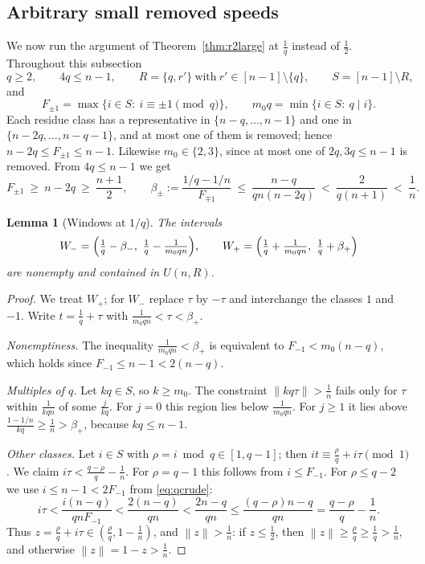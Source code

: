 \documentclass[11pt]{article}
\newtheorem{lemma}[theorem]{Lemma}
\theoremstyle{definition}
\newcommand{\norm}[1]{\left\lVert #1 \right\rVert}
\begin{document}
\subsection{Arbitrary small removed speeds}\label{sec:qgeneral}

We now run the argument of Theorem~\ref{thm:r2large} at $\frac1q$
instead of $\frac12$. Throughout this subsection
\[
q\ge2,\qquad 4q\le n-1,\qquad R=\{q,r'\}\ \text{with}\
r'\in[n-1]\setminus\{q\},\qquad S=[n-1]\setminus R,
\]
and
\[
F_{\pm1}=\max\{i\in S:\ i\equiv\pm1\pmod q\},\qquad
m_0q=\min\{i\in S:\ q\mid i\}.
\]
Each residue class has a representative in $\{n-q,\dots,n-1\}$ and one
in $\{n-2q,\dots,n-q-1\}$, and at most one of them is removed; hence
$n-2q\le F_{\pm1}\le n-1$. Likewise $m_0\in\{2,3\}$, since at most one
of $2q,3q\le n-1$ is removed. From $4q\le n-1$ we get
\begin{equation}\label{eq:qcrude}
F_{\pm1}\ \ge\ n-2q\ \ge\ \frac{n+1}2,\qquad
\beta_\pm:=\frac{1/q-1/n}{F_{\mp1}}\ \le\ \frac{n-q}{qn(n-2q)}
\ <\ \frac2{q(n+1)}\ <\ \frac1n .
\end{equation}

\begin{lemma}[Windows at $1/q$]\label{lem:qwin}
The intervals
\[
W_-=\Bigl(\tfrac1q-\beta_-,\ \tfrac1q-\tfrac1{m_0qn}\Bigr),\qquad
W_+=\Bigl(\tfrac1q+\tfrac1{m_0qn},\ \tfrac1q+\beta_+\Bigr)
\]
are nonempty and contained in $U(n,R)$.
\end{lemma}

\begin{proof}
We treat $W_+$; for $W_-$ replace $\tau$ by $-\tau$ and interchange the
classes $1$ and $-1$. Write $t=\frac1q+\tau$ with
$\frac1{m_0qn}<\tau<\beta_+$.

\emph{Nonemptiness.} The inequality $\frac1{m_0qn}<\beta_+$ is
equivalent to $F_{-1}<m_0(n-q)$, which holds since
$F_{-1}\le n-1<2(n-q)$.

\emph{Multiples of $q$.} Let $kq\in S$, so $k\ge m_0$. The constraint
$\norm{kq\tau}>\frac1n$ fails only for $\tau$ within $\frac1{kqn}$ of
some $\frac j{kq}$. For $j=0$ this region lies below
$\frac1{m_0qn}$. For $j\ge1$ it lies above
$\frac{1-1/n}{kq}\ge\frac1n>\beta_+$, because $kq\le n-1$.

\emph{Other classes.} Let $i\in S$ with $\rho=i\bmod q\in[1,q-1]$; then
$it\equiv\frac\rho q+i\tau\pmod1$. We claim
$i\tau<\frac{q-\rho}q-\frac1n$. For $\rho=q-1$ this follows from
$i\le F_{-1}$. For $\rho\le q-2$ we use $i\le n-1<2F_{-1}$ from
\eqref{eq:qcrude}:
\[
i\tau<\frac{i(n-q)}{qnF_{-1}}<\frac{2(n-q)}{qn}<\frac{2n-q}{qn}
\le\frac{(q-\rho)n-q}{qn}=\frac{q-\rho}q-\frac1n .
\]
Thus $z=\frac\rho q+i\tau\in(\frac\rho q,1-\frac1n)$, and
$\norm{z}>\frac1n$: if $z\le\frac12$, then $\norm z\ge\frac\rho
q\ge\frac1q>\frac1n$, and otherwise $\norm z=1-z>\frac1n$.
\end{proof}
\end{document}
